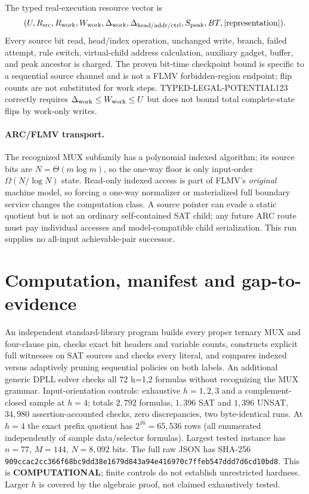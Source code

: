 \documentclass[11pt]{article}
\begin{document}
The typed real-execution resource vector is
\[
 (U,R_{\rm src},R_{\rm work},W_{\rm work},
 \Delta_{\rm work},\Delta_{\rm head/addr/ctrl},
 S_{\rm peak},BT,|\mathrm{representation}|).
\]
Every source bit read, head/index operation, unchanged write, branch, failed attempt, rule switch, virtual-child address calculation, auxiliary gadget, buffer, and peak ancestor is charged. The proven bit-time checkpoint bound is specific to a sequential source channel and is not a FLMV forbidden-region endpoint; flip counts are not substituted for work steps. TYPED-LEGAL-POTENTIAL123 correctly requires $\Delta_{\rm work}\le W_{\rm work}\le U$ but does not bound total complete-state flips by work-only writes.

\paragraph{ARC/FLMV transport.}
The recognized MUX subfamily has a polynomial indexed algorithm; its source bits are $N=\Theta(m\log m)$, so the one-way floor is only input-order $\Omega(N/\log N)$ state. Read-only indexed access is part of FLMV's \emph{original} machine model, so forcing a one-way normalizer or materialized full boundary service changes the computation class. A source pointer can evade a static quotient but is not an ordinary self-contained SAT child; any future ARC route must pay individual accesses and model-compatible child serialization. This run supplies no all-input achievable-pair successor.

\section{Computation, manifest and gap-to-evidence}
An independent standard-library program builds every proper ternary MUX and four-clause pin, checks exact bit headers and variable counts, constructs explicit full witnesses on SAT sources and checks every literal, and compares indexed versus adaptively pruning sequential policies on both labels. An additional generic DPLL solver checks all $72$ h=1,2 formulas without recognizing the MUX grammar. Input-orientation controls: exhaustive $h=1,2,3$ and a complement-closed sample at $h=4$; totals $2{,}792$ formulas, $1{,}396$ SAT and $1{,}396$ UNSAT, $34{,}980$ assertion-accounted checks, zero discrepancies, two byte-identical runs. At $h=4$ the exact prefix quotient has $2^{16}=65{,}536$ rows (all enumerated independently of sample data/selector formulas). Largest tested instance has $n=77$, $M=144$, $N=8{,}092$ bits. The full raw JSON has SHA-256 \texttt{909ccac2cc366f68bc9dd38e1679d843a94e416970c7ffeb547ddd7d6cd10bd8}. This is \textbf{COMPUTATIONAL}; finite controls do not establish unrestricted hardness. Larger $h$ is covered by the algebraic proof, not claimed exhaustively tested.
\end{document}
